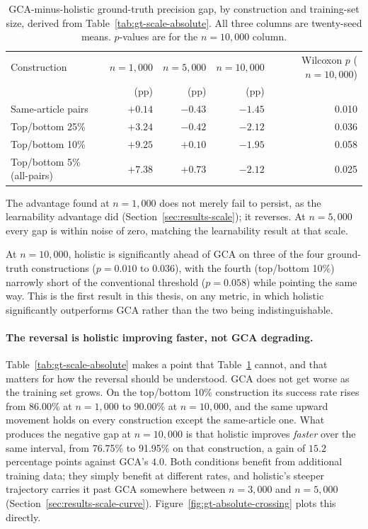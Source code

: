 \begin{table}[htbp]
\centering
\caption[Ground-truth precision gap across training-set size]{GCA-minus-holistic ground-truth precision gap, by construction and
training-set size, derived from Table~\ref{tab:gt-scale-absolute}. All three
columns are twenty-seed means. $p$-values are for the $n=10{,}000$ column.}
\label{tab:gt-scale}
\small
\setlength{\tabcolsep}{5pt}
\begin{tabular}{lrrrr}
\toprule
Construction & $n=1{,}000$ & $n=5{,}000$ & $n=10{,}000$ & Wilcoxon $p$ ($n{=}10{,}000$) \\
 & (pp) & (pp) & (pp) & \\
\midrule
Same-article pairs        & $+0.14$ & $-0.43$ & $-1.45$ & 0.010 \\
Top/bottom 25\%           & $+3.24$ & $-0.42$ & $-2.12$ & 0.036 \\
Top/bottom 10\%           & $+9.25$ & $+0.10$ & $-1.95$ & 0.058 \\
Top/bottom 5\% (all-pairs) & $+7.38$ & $+0.73$ & $-2.12$ & 0.025 \\
\bottomrule
\end{tabular}
\end{table}

The advantage found at $n=1{,}000$ does not merely fail to persist, as the
learnability advantage did (Section~\ref{sec:results-scale}); it reverses.
At $n=5{,}000$ every gap is within noise of zero, matching the learnability
result at that scale.

\begin{keyfinding}
At $n=10{,}000$, holistic is significantly ahead of GCA on three of the four
ground-truth constructions ($p=0.010$ to $0.036$), with the fourth
(top/bottom 10\%) narrowly short of the conventional threshold ($p=0.058$)
while pointing the same way. This is the first result in this thesis, on any
metric, in which holistic significantly outperforms GCA rather than the two
being indistinguishable.
\end{keyfinding}

\paragraph{The reversal is holistic improving faster, not GCA degrading.}
Table~\ref{tab:gt-scale-absolute} makes a point that
Table~\ref{tab:gt-scale} cannot, and that matters for how the reversal
should be understood. GCA does not get worse as the training set grows. On
the top/bottom 10\% construction its success rate rises from 86.00\% at
$n=1{,}000$ to 90.00\% at $n=10{,}000$, and the same upward movement holds
on every construction except the same-article one. What produces the
negative gap at $n=10{,}000$ is that holistic improves \emph{faster} over
the same interval, from 76.75\% to 91.95\% on that construction, a gain of
$15.2$ percentage points against GCA's $4.0$. Both conditions benefit from
additional training data; they simply benefit at different rates, and
holistic's steeper trajectory carries it past GCA somewhere between
$n=3{,}000$ and $n=5{,}000$ (Section~\ref{sec:results-scale-curve}).
Figure~\ref{fig:gt-absolute-crossing} plots this directly.


